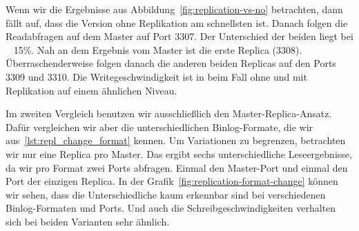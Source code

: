 Wenn wir die Ergebnisse aus Abbildung~\ref{fig:replication-vs-no} betrachten, dann fällt auf, dass die Version ohne Replikation am schnellsten ist.
Danach folgen die Readabfragen auf dem Master auf Port 3307.
Der Unterschied der beiden liegt bei ~ 15\%.
Nah an dem Ergebnis vom Master ist die erste Replica (3308).
Überraschenderweise folgen danach die anderen beiden Replicas auf den Ports 3309 und 3310.
Die Writegeschwindigkeit ist in beim Fall ohne und mit Replikation auf einem ähnlichen Niveau.

Im zweiten Vergleich benutzen wir ausschließlich den Master-Replica-Ansatz.
Dafür vergleichen wir aber die unterschiedlichen Binlog-Formate, die wir aus~\ref{lst:repl_change_format} kennen.
Um Variationen zu begrenzen, betrachten wir nur eine Replica pro Master.
Das ergibt sechs unterschiedliche Leseergebnisse, da wir pro Format zwei Ports abfragen.
Einmal den Master-Port und einmal den Port der einzigen Replica.
In der Grafik~\ref{fig:replication-format-change} können wir sehen, dass die Unterschiedliche kaum erkennbar sind bei verschiedenen Binlog-Formaten und Ports.
Und auch die Schreibgeschwindigkeiten verhalten sich bei beiden Varianten sehr ähnlich.

